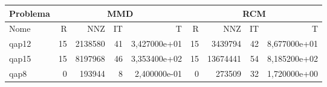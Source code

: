 \begin{tabular}{|l|r|r|r|r|r|r|r|r|}
\hline
\multicolumn{1}{|c|}{Problema} & \multicolumn{4}{|c|}{MMD} &         \multicolumn{4}{|c|}{RCM} \\ \hline
Nome & R & NNZ & IT & T & R & NNZ & IT & T \\ \hline
qap12 & 15 & 2138580 & 41 & 3,427000e+01 & 15 & 3439794 & 42 & 8,677000e+01 \\ \hline
qap15 & 15 & 8197968 & 46 & 3,353400e+02 & 15 & 13674441 & 54 & 8,185200e+02 \\ \hline
qap8 & 0 & 193944 & 8 & 2,400000e-01 & 0 & 273509 & 32 & 1,720000e+00 \\ \hline
\end{tabular}
